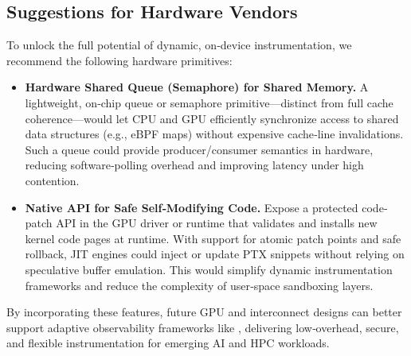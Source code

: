 \subsection{Suggestions for Hardware Vendors}
To unlock the full potential of dynamic, on‐device instrumentation, we recommend the following hardware primitives:
\begin{itemize}[leftmargin=*,itemsep=0pt]
  \item \textbf{Hardware Shared Queue (Semaphore) for Shared Memory.}  A lightweight, on‐chip queue or semaphore primitive—distinct from full cache coherence—would let CPU and GPU efficiently synchronize access to shared data structures (e.g., eBPF maps) without expensive cache‐line invalidations. Such a queue could provide producer/consumer semantics in hardware, reducing software‐polling overhead and improving latency under high contention.
  \item \textbf{Native API for Safe Self‐Modifying Code.}  Expose a protected code‐patch API in the GPU driver or runtime that validates and installs new kernel code pages at runtime. With support for atomic patch points and safe rollback, JIT engines could inject or update PTX snippets without relying on speculative buffer emulation. This would simplify dynamic instrumentation frameworks and reduce the complexity of user‐space sandboxing layers.
\end{itemize}
By incorporating these features, future GPU and interconnect designs can better support adaptive observability frameworks like \sys{}, delivering low‐overhead, secure, and flexible instrumentation for emerging AI and HPC workloads.
